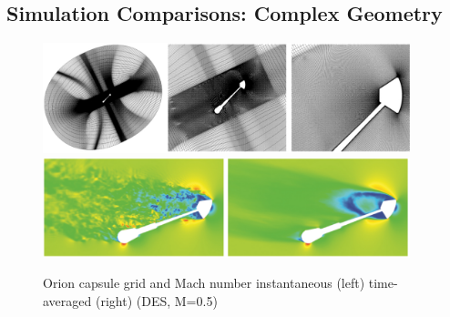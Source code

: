 \documentclass[journal]{new-aiaa}
\begin{document}
\subsection{Simulation Comparisons: Complex Geometry}



\begin{figure}[H]
\begin{center}
\includegraphics[width=0.95\textwidth]{Images/logan/schwing2015detachededdy_grid.pdf}
\includegraphics[width=0.95\textwidth]{Images/logan/schwing2015detachededdy_flow.pdf}
\caption{ Orion capsule grid and Mach number instantaneous (left) time-averaged (right) (DES, M=0.5) \cite{schwing2015detachededdy} }
\label{fig:oriongridflow}
\end{center}
\end{figure}


\end{document}
